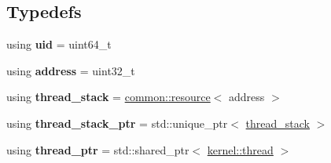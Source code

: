 \subsection*{Typedefs}
\begin{DoxyCompactItemize}
\item 
\mbox{\label{namespaceeka2l1_1_1kernel_a9d01f2027a07b451ba76db5714e11fc9}} 
using {\bfseries uid} = uint64\+\_\+t
\item 
\mbox{\label{namespaceeka2l1_1_1kernel_a855b5cad18b09d1729b5e78ffa178e05}} 
using {\bfseries address} = uint32\+\_\+t
\item 
\mbox{\label{namespaceeka2l1_1_1kernel_a7d72cd43c301d611906a46ececd7f18a}} 
using {\bfseries thread\+\_\+stack} = \mbox{\hyperlink{structeka2l1_1_1common_1_1resource}{common\+::resource}}$<$ address $>$
\item 
\mbox{\label{namespaceeka2l1_1_1kernel_a3e79355bbb1d6c9afd331e433627f7ee}} 
using {\bfseries thread\+\_\+stack\+\_\+ptr} = std\+::unique\+\_\+ptr$<$ \mbox{\hyperlink{structeka2l1_1_1common_1_1resource}{thread\+\_\+stack}} $>$
\item 
\mbox{\label{namespaceeka2l1_1_1kernel_a3177756d27751a6ed6d80008148bc1de}} 
using {\bfseries thread\+\_\+ptr} = std\+::shared\+\_\+ptr$<$ \mbox{\hyperlink{classeka2l1_1_1kernel_1_1thread}{kernel\+::thread}} $>$
\end{DoxyCompactItemize}
